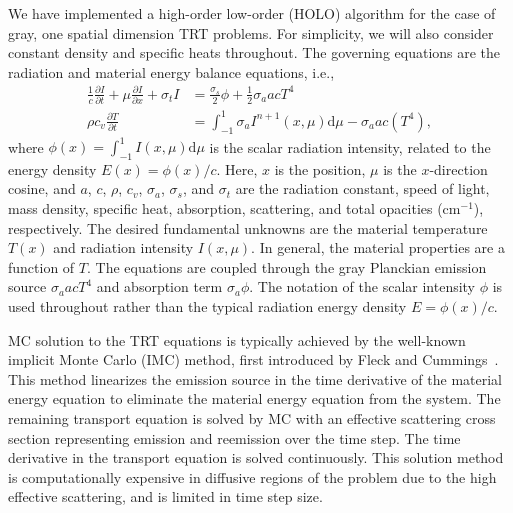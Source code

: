 \documentclass{mc2013}
\newcommand{\pderiv}[2]{\frac{\partial #1}{\partial #2}}
\renewcommand{\d}{\mathrm{d}}
\begin{document}
We have implemented a high-order low-order (HOLO) algorithm for the case of gray, one spatial dimension
TRT problems. For simplicity, we will also consider constant density and specific
heats throughout.  The governing equations are the radiation and
material energy balance equations, i.e.,
\begin{align}
    \frac{1}{c}\pderiv{I}{t} + \mu \pderiv{I}{x} + \sigma_t I
&= \frac{\sigma_s}{2} \phi +\frac{1}{2} \sigma_a a c T^4
  \\
  \rho c_v \pderiv{T}{t} &= \int_{-1}^{1} \sigma_a I^{n+1}(x,\mu)
\d\mu - \sigma_a a c (T^4),
\end{align}
where $\phi(x) = \int_{-1}^1 I(x,\mu) \d \mu$ is the scalar radiation intensity,
related to the energy density $E(x)=\phi(x)/c$. Here, $x$ is the position,  $\mu$ is
the $x$-direction cosine, and $a$, $c$, $\rho$, $c_v$, $\sigma_a$, $\sigma_s$, and
$\sigma_t$ are the radiation constant, speed of light, mass density, specific heat, absorption, scattering, and total
opacities (cm$^{-1}$), respectively.  The desired fundamental unknowns are the material
temperature $T(x)$ and radiation intensity $I(x,\mu)$.  In general, the material
properties are a function of $T$.
The equations are coupled through the gray Planckian emission source
$\sigma_a a c T^4$ and absorption term $\sigma_a \phi$.  
The notation of the scalar intensity $\phi$ is used throughout rather than the
typical radiation energy density $E=\phi(x)/c$.

MC solution to the TRT equations is typically achieved by the well-known
implicit Monte Carlo (IMC) method, first introduced by Fleck and Cummings~\cite{fnc}. This
method linearizes the emission source in the time derivative of the material energy
equation to eliminate the material energy equation from the system.  The remaining
transport equation is solved by MC with an effective scattering cross section representing
emission and reemission over the time step.  The time derivative in the transport
equation is solved continuously.  This
solution method is computationally expensive in diffusive regions of the problem due
to the high effective scattering, and is limited in time step size. 
\end{document}
